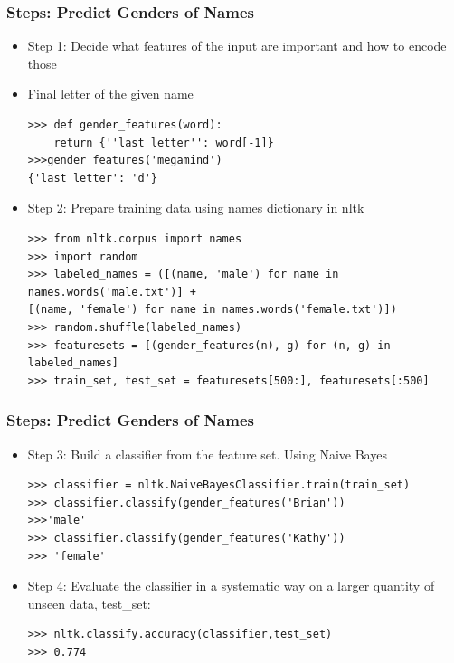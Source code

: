 \begin{frame}[fragile]\frametitle{Steps: Predict Genders of Names}
  \begin{itemize}
\item Step 1: Decide what features of the input are important and how to encode those
\item Final letter of the given name
\begin{lstlisting}
>>> def gender_features(word):
	return {''last letter'': word[-1]}
>>>gender_features('megamind')
{'last letter': 'd'}
\end{lstlisting}
\item Step 2: Prepare training data using names dictionary in nltk
\begin{lstlisting}
>>> from nltk.corpus import names
>>> import random
>>> labeled_names = ([(name, 'male') for name in names.words('male.txt')] +
[(name, 'female') for name in names.words('female.txt')])
>>> random.shuffle(labeled_names)
>>> featuresets = [(gender_features(n), g) for (n, g) in labeled_names]
>>> train_set, test_set = featuresets[500:], featuresets[:500]
\end{lstlisting}
  \end{itemize}
\end{frame}

\begin{frame}[fragile]\frametitle{Steps: Predict Genders of Names}
  \begin{itemize}
\item Step 3: Build a classifier from the feature set. Using Naive Bayes
\begin{lstlisting}
>>> classifier = nltk.NaiveBayesClassifier.train(train_set)
>>> classifier.classify(gender_features('Brian'))
>>>'male'
>>> classifier.classify(gender_features('Kathy'))
>>> 'female'
\end{lstlisting}
\item Step 4: Evaluate the classifier in a systematic way on a larger quantity of unseen data, test\_set:
\begin{lstlisting}
>>> nltk.classify.accuracy(classifier,test_set)
>>> 0.774
\end{lstlisting}
  \end{itemize}
\end{frame}

